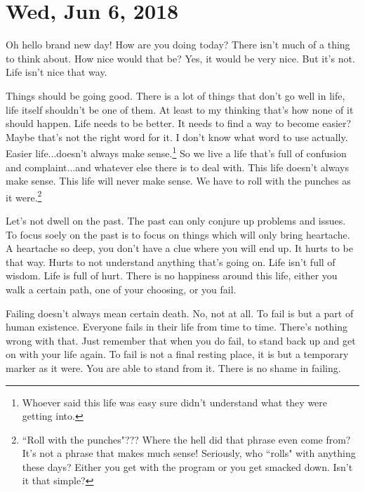 \section{Wed, Jun 6, 2018}

Oh hello brand new day! How are you doing today? There isn't much of a thing to
think about. How nice would that be? Yes, it would be very nice. But it's not.
Life isn't nice that way.

Things should be going good. There is a lot of things that don't go well in
life, life itself shouldn't be one of them. At least to my thinking that's how
none of it should happen. Life needs to be better. It needs to find a way to
become easier? Maybe that's not the right word for it. I don't know what word to
use actually. Easier life...doesn't always make sense.\footnote{Whoever said
this life was easy sure didn't understand what they were getting into.} So we
live a life that's full of confusion and complaint...and whatever else there is
to deal with. This life doesn't always make sense. This life will never make
sense. We have to roll with the punches as it were.\footnote{``Roll with the
punches"??? Where the hell did that phrase even come from? It's not a phrase
that makes much sense! Seriously, who ``rolls" with anything these days? Either
you get with the program or you get smacked down. Isn't it that simple?}

Let's not dwell on the past. The past can only conjure up problems and issues.
To focus soely on the past is to focus on things which will only bring
heartache. A heartache so deep, you don't have a clue where you will end up. It
hurts to be that way. Hurts to not understand anything that's going on. Life
isn't full of wisdom. Life is full of hurt. There is no happiness around this
life, either you walk a certain path, one of your choosing, or you fail.

Failing doesn't always mean certain death. No, not at all. To fail is but a part
of human existence. Everyone fails in their life from time to time. There's
nothing wrong with that. Just remember that when you do fail, to stand back up
and get on with your life again. To fail is not a final resting place, it is but
a temporary marker as it were. You are able to stand from it. There is no shame
in failing.
